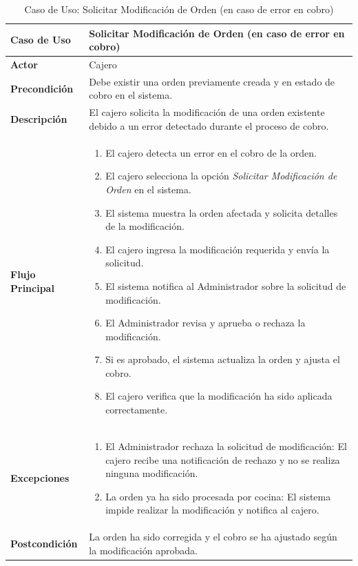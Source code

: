 \documentclass{article}
\begin{document}
\begin{table}[H]
    \centering
    \begin{tabular}{|p{4cm}|p{11cm}|}
    \hline
    \textbf{Caso de Uso}        & \textbf{Solicitar Modificación de Orden (en caso de error en cobro)} \\ \hline
    \textbf{Actor}              & Cajero \\ \hline
    \textbf{Precondición}       & Debe existir una orden previamente creada y en estado de cobro en el sistema. \\ \hline
    \textbf{Descripción}        & El cajero solicita la modificación de una orden existente debido a un error detectado durante el proceso de cobro. \\ \hline
    \textbf{Flujo Principal}    & 
    \begin{enumerate}
        \item El cajero detecta un error en el cobro de la orden.
        \item El cajero selecciona la opción \textit{Solicitar Modificación de Orden} en el sistema.
        \item El sistema muestra la orden afectada y solicita detalles de la modificación.
        \item El cajero ingresa la modificación requerida y envía la solicitud.
        \item El sistema notifica al Administrador sobre la solicitud de modificación.
        \item El Administrador revisa y aprueba o rechaza la modificación.
        \item Si es aprobado, el sistema actualiza la orden y ajusta el cobro.
        \item El cajero verifica que la modificación ha sido aplicada correctamente.
    \end{enumerate} \\ \hline
    \textbf{Excepciones}        & 
    \begin{enumerate}
        \item El Administrador rechaza la solicitud de modificación: El cajero recibe una notificación de rechazo y no se realiza ninguna modificación.
        \item La orden ya ha sido procesada por cocina: El sistema impide realizar la modificación y notifica al cajero.
    \end{enumerate} \\ \hline
    \textbf{Postcondición}      & La orden ha sido corregida y el cobro se ha ajustado según la modificación aprobada. \\ \hline
    \end{tabular}
    \caption{Caso de Uso: Solicitar Modificación de Orden (en caso de error en cobro)}
    \label{tab:solicitar_modificacion_orden}
\end{table}
\end{document}

